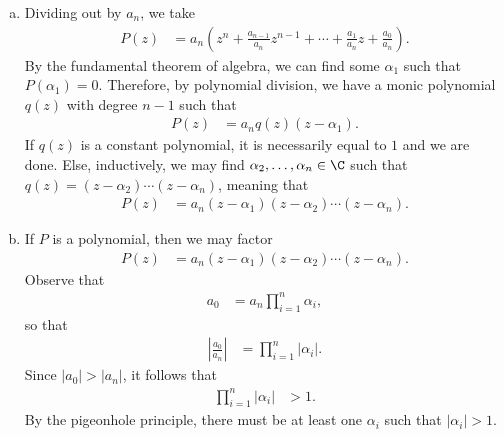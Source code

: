 \documentclass[10pt]{mypackage}
\begin{document}
\begin{solution}\hfill
  \begin{enumerate}[(a)]
    \item Dividing out by $a_n$, we take
      \begin{align*}
        P(z) &= a_n \left( z^{n} + \frac{a_{n-1}}{a_n}z^{n-1} + \cdots + \frac{a_1}{a_n}z + \frac{a_0}{a_n} \right).
      \end{align*}
      By the fundamental theorem of algebra, we can find some $\alpha_1$ such that $P\left( \alpha_1 \right) = 0$. Therefore, by polynomial division, we have a monic polynomial $q(z)$ with degree $n-1$ such that
      \begin{align*}
        P(z) &= a_n q(z)\left( z-\alpha_1 \right).
      \end{align*}
      If $q(z)$ is a constant polynomial, it is necessarily equal to $1$ and we are done. Else, inductively, we may find $\alpha_2,\dots,\alpha_n\in \C$ such that $q(z) = \left( z-\alpha_2 \right)\cdots \left( z-\alpha_n \right)$, meaning that
      \begin{align*}
        P(z) &= a_n\left( z-\alpha_1 \right)\left( z-\alpha_2 \right)\cdots \left( z-\alpha_n \right).
      \end{align*}
    \item If $P$ is a polynomial, then we may factor
      \begin{align*}
        P(z) &= a_n \left( z-\alpha_1 \right)\left( z-\alpha_2 \right)\cdots \left( z-\alpha_n \right).
      \end{align*}
      Observe that
      \begin{align*}
        a_0 &= a_n\prod_{i=1}^{n}\alpha_i,
      \end{align*}
      so that
      \begin{align*}
        \left\vert \frac{a_0}{a_n} \right\vert &= \prod_{i=1}^{n} \left\vert \alpha_i \right\vert.
      \end{align*}
      Since $\left\vert a_0 \right\vert > \left\vert a_n \right\vert$, it follows that
      \begin{align*}
        \prod_{i=1}^{n} \left\vert \alpha_i \right\vert &> 1.
      \end{align*}
      By the pigeonhole principle, there must be at least one $\alpha_i$ such that $\left\vert \alpha_i \right\vert > 1$.
  \end{enumerate}
\end{solution}
\end{document}
